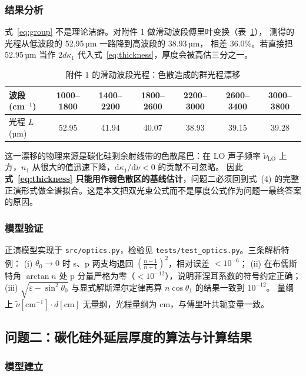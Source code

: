 \documentclass[12pt]{article}
\begin{document}
\subsubsection{结果分析}

式~\eqref{eq:group} 不是理论洁癖。对附件 1 做滑动波段傅里叶变换（表~\ref{tab:scan}），
测得的光程从低波段的 52.95\,µm 一路降到高波段的 38.93\,µm，
相差 36.0\%。若直接把 52.95\,µm 当作 $2d\kappa_1$
代入式~\eqref{eq:thickness}，厚度会被高估三分之一。

\begin{table}[!htbp]
  \centering
  \caption{附件 1 的滑动波段光程：色散造成的群光程漂移}\label{tab:scan}
  \small
  \begin{tabular}{lcccccc}
    \toprule
    波段 (cm$^{-1}$) & 1000--1800 & 1400--2200 & 1800--2600 & 2200--3000 & 2600--3400 & 3000--3800 \\
    \midrule
    光程 $L$ (µm) & 52.95 & 41.94 & 40.07 & 38.93 & 39.15 & 39.28 \\
    \bottomrule
  \end{tabular}
\end{table}

这一漂移的物理来源是碳化硅剩余射线带的色散尾巴：在 LO 声子频率 $\tilde\nu_{\mathrm{LO}}$
上方，$n_1$ 从很大的值迅速下降，$\mathrm{d}\kappa_1/\mathrm{d}\tilde\nu<0$ 的贡献不可忽略。
因此\textbf{式~\eqref{eq:thickness} 只能用作弱色散区的基线估计}，问题二必须回到式~(4) 的完整
正演形式做全谱拟合。这是本文把双光束公式而不是厚度公式作为问题一最终答案的原因。

\subsubsection{模型验证}

正演模型实现于 \texttt{src/optics.py}，检验见 \texttt{tests/test\_optics.py}。三条解析特例：
(i) $\theta_0\to0$ 时 s、p 两支均退回 $\left(\frac{n-1}{n+1}\right)^2$，相对误差 $<10^{-6}$；
(ii) 在布儒斯特角 $\arctan n$ 处 p 分量严格为零（$<10^{-12}$），说明菲涅耳系数的符号约定正确；
(iii) $\sqrt{\varepsilon-\sin^2\theta_0}$ 与显式解斯涅尔定律再算 $n\cos\theta_1$ 的结果一致到 $10^{-12}$。
量纲上 $\tilde\nu[\mathrm{cm}^{-1}]\cdot d[\mathrm{cm}]$ 无量纲，光程量纲为 cm，与傅里叶共轭变量一致。

\subsection{问题二：碳化硅外延层厚度的算法与计算结果}

\subsubsection{模型建立}
\end{document}
